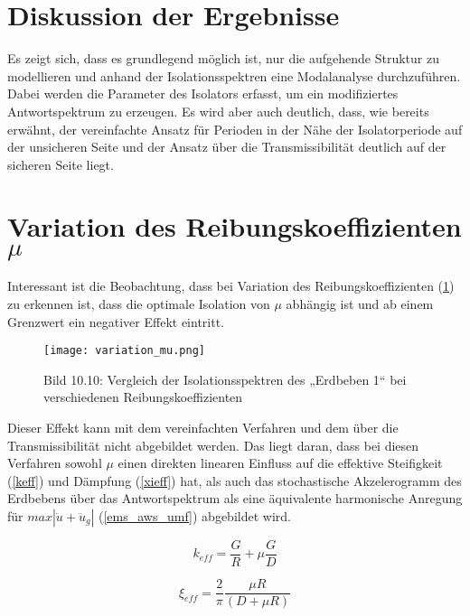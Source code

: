 \section{Diskussion der Ergebnisse}
\label{sec:diskussion}

Es zeigt sich, dass es grundlegend möglich ist, nur die aufgehende Struktur zu modellieren und anhand der Isolationsspektren eine Modalanalyse durchzuführen.
Dabei werden die Parameter des Isolators erfasst, um ein modifiziertes Antwortspektrum zu erzeugen.
Es wird aber auch deutlich, dass, wie bereits erwähnt, der vereinfachte Ansatz für Perioden in der Nähe der Isolatorperiode auf der unsicheren Seite und der Ansatz über die Transmissibilität deutlich auf der sicheren Seite liegt.

\section{Variation des Reibungskoeffizienten $\mu$}
\label{sec:muvariation}

Interessant ist die Beobachtung, dass bei Variation des Reibungskoeffizienten (\cref{fig:muvariation}) zu erkennen ist, dass die optimale Isolation von $\mu$ abhängig ist und ab einem Grenzwert ein negativer Effekt eintritt.

\begin{figure}[h]
    \centering
    \texttt{[image: variation\_mu.png]}
    \caption{Bild 10.10: Vergleich der Isolationsspektren des „Erdbeben 1“ bei verschiedenen Reibungskoeffizienten \cite{Isemann}}
    \label{fig:muvariation}
\end{figure}

Dieser Effekt kann mit dem vereinfachten Verfahren und dem über die Transmissibilität nicht abgebildet werden. Das liegt daran, dass bei diesen Verfahren sowohl $\mu$ einen direkten linearen Einfluss auf die effektive Steifigkeit (\cref{keff}) und Dämpfung (\cref{xieff}) hat, als auch das stochastische Akzelerogramm des Erdbebens über das Antwortspektrum als eine äquivalente harmonische Anregung für $max|\ddot u + \ddot u_g|$ (\cref{ems_aws_umf}) abgebildet wird.

\begin{equation*}
k_{eff} = \frac{G}{R} + \mu \frac{G}{D}
\end{equation*}

\begin{equation*}
\xi_{eff} = \frac{2}{\pi} \frac{\mu R}{(D + \mu R)}
\end{equation*}

